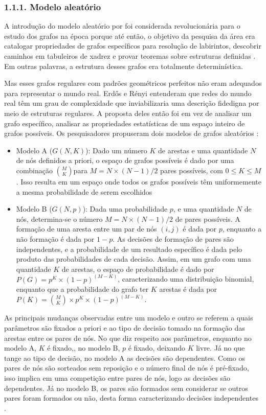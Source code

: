 \documentclass[12pt,oneside,a4paper,brazil,sumario=tradicional]{abntex2}
\begin{document}
\subsubsection*{1.1.1. Modelo aleatório}
A introdução do modelo aleatório por \textcite{erdos1959} foi considerada revolucionária para o estudo dos grafos na época porque até então, o objetivo da pesquisa da área era catalogar propriedades de grafos específicos para resolução de labirintos, descobrir  caminhos em tabuleiros de xadrez e provar teoremas sobre estruturas definidas \parencite{barabasi2002}. Em outras palavras, a estrutura desses grafos era totalmente determinística.

Mas esses grafos regulares com padrões geométricos perfeitos não eram adequados para representar o mundo real. Erdős e Rényi entenderam que redes do mundo real têm um grau de complexidade que inviabilizaria uma descrição fidedigna por meio de estruturas regulares. A proposta deles então foi em vez de analisar um grafo específico, analisar as propriedades estatísticas de um espaço inteiro de grafos possíveis. Os pesquisadores propuseram dois modelos de grafos aleatórios \parencite{latora2017}:

\begin{itemize}
  \item Modelo A ($G(N,K)$): Dado um número $K$ de arestas e uma quantidade $N$ de nós definidos a priori, o espaço de grafos possíveis é dado por uma combinação $\binom{M}{K}$para $M = N \times (N-1)/2$ pares possíveis, com $0 \le K \le M$. Isso resulta em um espaço onde todos os grafos possíveis têm uniformemente a mesma probabilidade de serem escolhidos
  \item Modelo B ($G(N,p)$): Dada uma probabilidade $p$, e uma quantidade $N$ de nós, determina-se o número $M = N \times (N-1)/2$ de pares possíveis. A formação de uma aresta entre um par de nós $(i,j)$ é dada por $p$, enquanto a não formação é dada por $1-p$. As decisões de formação de pares são independentes, e a probabilidade de um resultado específico é dada pelo produto das probabilidades de cada decisão. Assim, em um grafo com uma quantidade $K$ de arestas, o espaço de probabilidade é dado por  $P(G) = p^{K} \times (1-p)^{(M-K)}$, caracterizando uma distribuição binomial, enquanto que a probabilidade do grafo ter $K$ arestas é dada por $P(K) = \binom{M}{K} \times p^{K} \times (1-p)^{(M-K)}$.
\end{itemize}

As principais mudanças observadas entre um modelo e outro se referem a quais parâmetros são fixados a priori e ao tipo de decisão tomado na formação das arestas entre os pares de nós. No que diz respeito aos parâmetros, enquanto no modelo A, $K$ é fixado,, no modelo B, $p$ é fixado, deixando $K$ livre. Já no que tange ao tipo de decisão, no modelo A as decisões são dependentes. Como os pares de nós são sorteados sem reposição e o número final de nós é pré-fixado, isso implica em uma competição entre pares de nós, logo as decisões são dependentes. Já no modelo B, os pares são formados sem considerar se outros pares foram formados ou não, desta forma caracterizando decisões independentes  \parencite{latora2017}.
\end{document}

